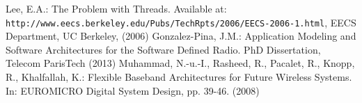 \documentclass{llncs}
\begin{document}
\begin{flushleft}
\begin{thebibliography}{99}
%
Lee, E.A.: The Problem with Threads. Available at:
\texttt{http://www.eecs.berkeley.edu/Pubs/TechRpts/2006/EECS-2006-1.html}, EECS Department, UC Berkeley, (2006)
%
%
Gonzalez-Pina, J.M.: Application Modeling and Software Architectures for the Software Defined Radio. PhD Dissertation,
Telecom ParisTech (2013)
%
%
Muhammad, N.-u.-I., Rasheed, R., Pacalet, R., Knopp, R., Khalfallah, K.: Flexible Baseband Architectures for Future Wireless
Systems. In: EUROMICRO Digital System Design, pp. 39-46. (2008)
%

\end{thebibliography}
\end{flushleft}
\end{document}
